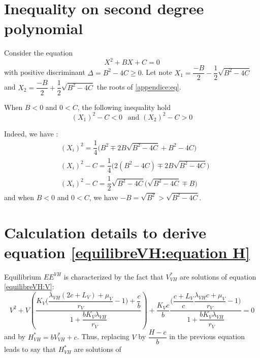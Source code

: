 \documentclass{article}
\newcommand{\lv}{\lambda_{VH}}
\begin{document}
\begin{appendices}
\section{Inequality on second degree polynomial \label{appendice:ineq2nd}}

Consider the equation
\begin{equation}
X^2 + B X + C = 0
\label{appendice:eq}
\end{equation}
with positive discriminant $\Delta = B^2 - 4C \geq 0$. Let note $X_{1} = \dfrac{-B}{2} - \dfrac{1}{2} \sqrt{B^2 - 4 C}$ and $X_2 = \dfrac{-B}{2} + \dfrac{1}{2} \sqrt{B^2 - 4 C}$  the roots of \eqref{appendice:eq}.

When $B < 0$ and $0 < C$, the following inequality hold
\begin{equation}
(X_1) ^ 2 - C < 0 \:\:\text{ and } (X_2)^2 - C > 0
\end{equation}

Indeed, we have :
\begin{subequations}
\begin{align}
&(X_i) ^2 = \dfrac{1}{4} \Big(B^2 \mp 2 B\sqrt{B^2 - 4C} + B^2 - 4C \Big) \\
&(X_i)^2 - C = \dfrac{1}{4} \Big(2(B^2 - 4C) \mp 2B \sqrt{B^2 - 4C} \Big) \\
&(X_i)^2 - C = \dfrac{1}{2} \sqrt{B^2 - 4C} \Big( \sqrt{B^2 - 4C} \mp B \Big)
\end{align}
\end{subequations}
and when $B < 0$ and $0 < C$, we have $ -B = \sqrt{B^2} > \sqrt{B^2 - 4C}$.

\section{Calculation details to derive equation \eqref{equilibreVH:equation H} \label{appendix:equilibreVH:equation H}}
Equilibrium $EE^{VH}$ is characterized by the fact that $V^*_{VH}$ are solutions of equation \eqref{equilibreVH:V}:
\begin{equation*}
V^2 + V \left(\dfrac{K_V\Big(\dfrac{\lv(2c+L_V) + \mu_V}{r_V} - 1\Big) + \dfrac{c}{b}}{1 + \dfrac{b K_V \lv}{r_V}}  \right) + \dfrac{K_Vc}{b} \dfrac{\Big(\dfrac{c+L_V}{c} \dfrac{\lv c + \mu_V}{r_V} - 1\Big)}{1 + \dfrac{b K_V \lv}{r_V}} = 0
\end{equation*}
and by $H^*_{VH} = b V^*_{VH} + c$. Thus, replacing $V$ by $\dfrac{H-c}{b}$ in the previous equation leads to say that $H^*_{VH}$ are solutions of


\end{appendices}
\end{document}
